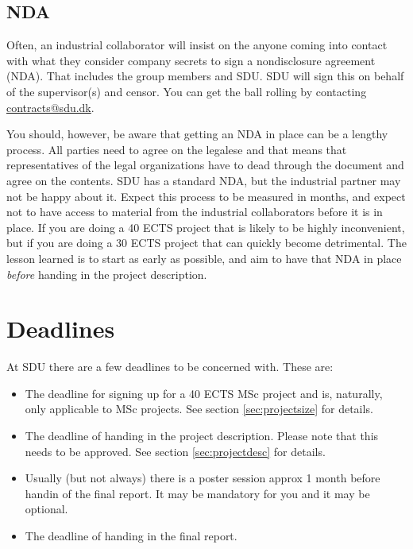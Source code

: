 \documentclass[a4paper]{memoir}
\begin{document}

\subsection{NDA}

Often, an industrial collaborator will insist on the anyone coming into contact with what they consider company secrets to sign a nondisclosure agreement (NDA). That includes the group members and SDU. SDU will sign this on behalf of the supervisor(s) and censor. You can get the ball rolling by contacting \href{mailto:contracts@sdu.dk}{contracts@sdu.dk}.

You should, however, be aware that getting an NDA in place can be a lengthy process. All parties need to agree on the legalese and that means that representatives of the legal organizations have to dead through the document and agree on the contents. SDU has a standard NDA, but the industrial partner may not be happy about it. Expect this process to be measured in months, and expect not to have access to material from the industrial collaborators before it is in place. If you are doing a 40 ECTS project that is likely to be highly inconvenient, but if you are doing a 30 ECTS project that can quickly become detrimental. The lesson learned is to start as early as possible, and aim to have that NDA in place \textsl{before} handing in the project description.

\section{Deadlines}

At SDU there are a few deadlines to be concerned with. These are:
\begin{itemize}
  \item The deadline for signing up for a 40 ECTS MSc project and is, naturally, only applicable to MSc projects. See section \ref{sec:projectsize} for details.
  \item The deadline of handing in the project description. Please note that this needs to be approved. See section \ref{sec:projectdesc} for details.
  \item Usually (but not always) there is a poster session approx 1 month before handin of the final report. It may be mandatory for you and it may be optional.
  \item The deadline of handing in the final report.
\end{itemize}
\end{document}
